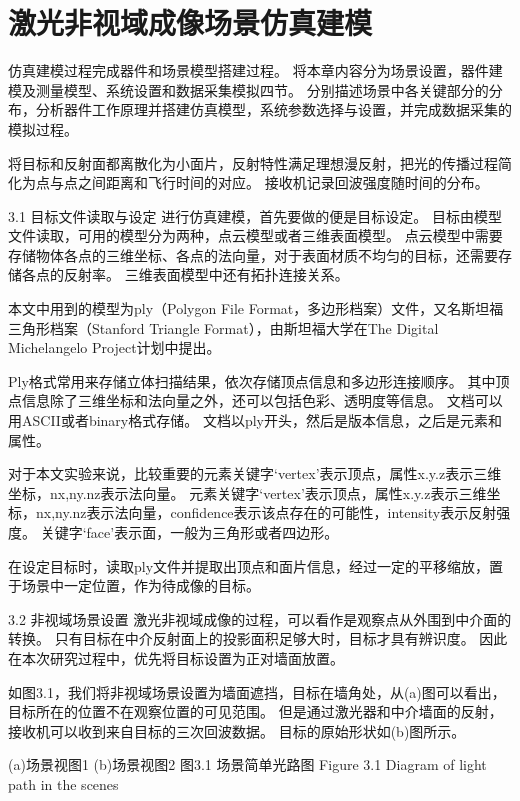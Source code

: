 \chapter{激光非视域成像场景仿真建模}\label{chap:SceneModel}

仿真建模过程完成器件和场景模型搭建过程。
将本章内容分为场景设置，器件建模及测量模型、系统设置和数据采集模拟四节。
分别描述场景中各关键部分的分布，分析器件工作原理并搭建仿真模型，系统参数选择与设置，并完成数据采集的模拟过程。

将目标和反射面都离散化为小面片，反射特性满足理想漫反射，把光的传播过程简化为点与点之间距离和飞行时间的对应。
接收机记录回波强度随时间的分布。

3.1  目标文件读取与设定
进行仿真建模，首先要做的便是目标设定。
目标由模型文件读取，可用的模型分为两种，点云模型或者三维表面模型。
点云模型中需要存储物体各点的三维坐标、各点的法向量，对于表面材质不均匀的目标，还需要存储各点的反射率。
三维表面模型中还有拓扑连接关系。

本文中用到的模型为ply（Polygon File Format，多边形档案）文件，又名斯坦福三角形档案（Stanford Triangle Format），由斯坦福大学在The Digital Michelangelo Project计划中提出。

Ply格式常用来存储立体扫描结果，依次存储顶点信息和多边形连接顺序。
其中顶点信息除了三维坐标和法向量之外，还可以包括色彩、透明度等信息。
文档可以用ASCII或者binary格式存储。
文档以ply开头，然后是版本信息，之后是元素和属性。

对于本文实验来说，比较重要的元素关键字‘vertex’表示顶点，属性x.y.z表示三维坐标，nx,ny.nz表示法向量。
元素关键字‘vertex’表示顶点，属性x.y.z表示三维坐标，nx,ny.nz表示法向量，confidence表示该点存在的可能性，intensity表示反射强度。
关键字‘face’表示面，一般为三角形或者四边形。

在设定目标时，读取ply文件并提取出顶点和面片信息，经过一定的平移缩放，置于场景中一定位置，作为待成像的目标。


3.2  非视域场景设置
激光非视域成像的过程，可以看作是观察点从外围到中介面的转换。
只有目标在中介反射面上的投影面积足够大时，目标才具有辨识度。
因此在本次研究过程中，优先将目标设置为正对墙面放置。

如图3.1，我们将非视域场景设置为墙面遮挡，目标在墙角处，从(a)图可以看出，目标所在的位置不在观察位置的可见范围。
但是通过激光器和中介墙面的反射，接收机可以收到来自目标的三次回波数据。
目标的原始形状如(b)图所示。


   
(a)场景视图1                       (b)场景视图2
图3.1  场景简单光路图
Figure 3.1 Diagram of light path in the scenes

